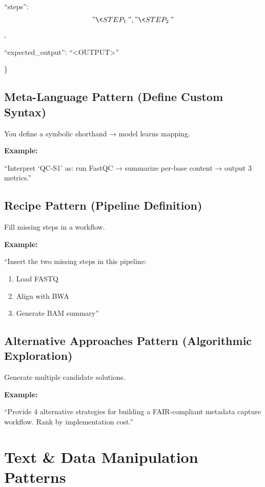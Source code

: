 \documentclass[
  letterpaper,
  DIV=11,
  numbers=noendperiod]{scrreprt}
\begin{document}
``steps'': \["\<STEP_1\>", "\<STEP_2\>"\],

``expected\_output'': ``\textless OUTPUT\textgreater{}''

\}

\subsection{Meta-Language Pattern (Define Custom
Syntax)}\label{meta-language-pattern-define-custom-syntax}

You define a symbolic shorthand → model learns mapping.

\textbf{Example:}

``Interpret `QC-S1' as: run FastQC → summarize per-base content → output
3 metrics.''

\subsection{Recipe Pattern (Pipeline
Definition)}\label{recipe-pattern-pipeline-definition}

Fill missing steps in a workflow.

\textbf{Example:}

``Insert the two missing steps in this pipeline:

\begin{enumerate}
\def\labelenumi{\arabic{enumi}.}
\item
  Load FASTQ
\item
  Align with BWA
\item
  Generate BAM summary''
\end{enumerate}

\subsection{Alternative Approaches Pattern (Algorithmic
Exploration)}\label{alternative-approaches-pattern-algorithmic-exploration}

Generate multiple candidate solutions.

\textbf{Example:}

``Provide 4 alternative strategies for building a FAIR-compliant
metadata capture workflow. Rank by implementation cost.''

\section{Text \& Data Manipulation
Patterns}\label{text-data-manipulation-patterns}
\end{document}
